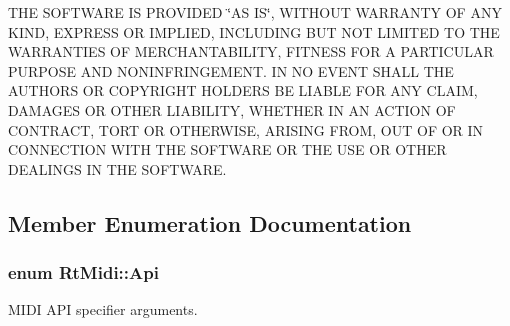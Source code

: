 T\+HE S\+O\+F\+T\+W\+A\+RE IS P\+R\+O\+V\+I\+D\+ED \char`\"{}\+A\+S I\+S\char`\"{}, W\+I\+T\+H\+O\+UT W\+A\+R\+R\+A\+N\+TY OF A\+NY K\+I\+ND, E\+X\+P\+R\+E\+SS OR I\+M\+P\+L\+I\+ED, I\+N\+C\+L\+U\+D\+I\+NG B\+UT N\+OT L\+I\+M\+I\+T\+ED TO T\+HE W\+A\+R\+R\+A\+N\+T\+I\+ES OF M\+E\+R\+C\+H\+A\+N\+T\+A\+B\+I\+L\+I\+TY, F\+I\+T\+N\+E\+SS F\+OR A P\+A\+R\+T\+I\+C\+U\+L\+AR P\+U\+R\+P\+O\+SE A\+ND N\+O\+N\+I\+N\+F\+R\+I\+N\+G\+E\+M\+E\+NT. IN NO E\+V\+E\+NT S\+H\+A\+LL T\+HE A\+U\+T\+H\+O\+RS OR C\+O\+P\+Y\+R\+I\+G\+HT H\+O\+L\+D\+E\+RS BE L\+I\+A\+B\+LE F\+OR A\+NY C\+L\+A\+IM, D\+A\+M\+A\+G\+ES OR O\+T\+H\+ER L\+I\+A\+B\+I\+L\+I\+TY, W\+H\+E\+T\+H\+ER IN AN A\+C\+T\+I\+ON OF C\+O\+N\+T\+R\+A\+CT, T\+O\+RT OR O\+T\+H\+E\+R\+W\+I\+SE, A\+R\+I\+S\+I\+NG F\+R\+OM, O\+UT OF OR IN C\+O\+N\+N\+E\+C\+T\+I\+ON W\+I\+TH T\+HE S\+O\+F\+T\+W\+A\+RE OR T\+HE U\+SE OR O\+T\+H\+ER D\+E\+A\+L\+I\+N\+GS IN T\+HE S\+O\+F\+T\+W\+A\+RE. 

\subsection{Member Enumeration Documentation}
\subsubsection[{Api}]{\setlength{\rightskip}{0pt plus 5cm}enum {\bf Rt\+Midi\+::\+Api}}\hypertarget{class_rt_midi_aac66af04a85fe5c5f07c360574a19406}{}\label{class_rt_midi_aac66af04a85fe5c5f07c360574a19406}


M\+I\+DI A\+PI specifier arguments. 

